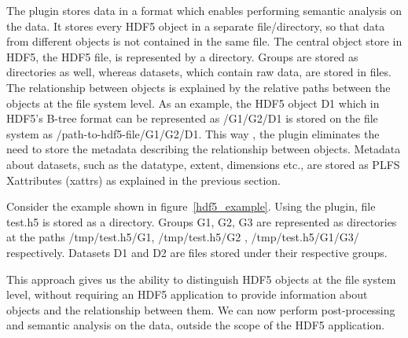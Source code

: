 The plugin stores data in a format which enables performing semantic analysis on the data. 
It stores every HDF5 object in a separate file/directory, so that data from different objects is not contained in the same file. 
The central object store in HDF5, the HDF5 file, is represented by a directory. Groups are stored as directories as well, whereas datasets, which contain raw data, are stored in files. 
The relationship between objects is explained by the relative paths between the objects at the file system level. As an example, the HDF5 object D1 which in HDF5's B-tree format can be represented as /G1/G2/D1 is stored on the file system as /path-to-hdf5-file/G1/G2/D1. This way , the plugin eliminates the need to store the metadata describing the relationship between objects. Metadata about datasets, such as the datatype, extent, dimensions etc., are stored as PLFS Xattributes (xattrs) as explained in the previous section. 

Consider the example shown in figure~\ref{hdf5_example}. Using the plugin, file test.h5 is stored as a directory. Groups G1, G2, G3 are represented as directories at the paths /tmp/test.h5/G1, /tmp/test.h5/G2 , /tmp/test.h5/G1/G3/ respectively. Datasets D1 and D2 are files stored under their respective groups. 

This approach gives us the ability to distinguish HDF5 objects at the file system level, without requiring an HDF5 application to provide information about objects and the relationship between them. 
We can now perform post-processing and semantic analysis on the data, outside the scope of the HDF5 application. 


